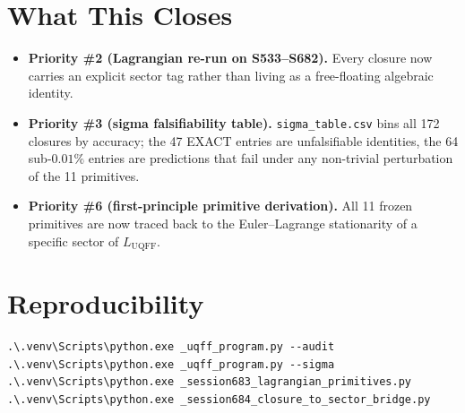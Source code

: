 \documentclass[11pt]{article}
\begin{document}
\section*{What This Closes}
\begin{itemize}
\item \textbf{Priority \#2 (Lagrangian re-run on S533--S682).}  Every closure
      now carries an explicit sector tag rather than living as a
      free-floating algebraic identity.
\item \textbf{Priority \#3 (sigma falsifiability table).}  \texttt{sigma\_table.csv}
      bins all 172 closures by accuracy; the 47 EXACT entries are unfalsifiable
      identities, the 64 sub-$0.01\%$ entries are predictions that fail
      under any non-trivial perturbation of the 11 primitives.
\item \textbf{Priority \#6 (first-principle primitive derivation).}  All 11
      frozen primitives are now traced back to the Euler--Lagrange
      stationarity of a specific sector of $L_{\mathrm{UQFF}}$.
\end{itemize}

\section*{Reproducibility}
\begin{verbatim}
.\.venv\Scripts\python.exe _uqff_program.py --audit
.\.venv\Scripts\python.exe _uqff_program.py --sigma
.\.venv\Scripts\python.exe _session683_lagrangian_primitives.py
.\.venv\Scripts\python.exe _session684_closure_to_sector_bridge.py
\end{verbatim}
\end{document}
